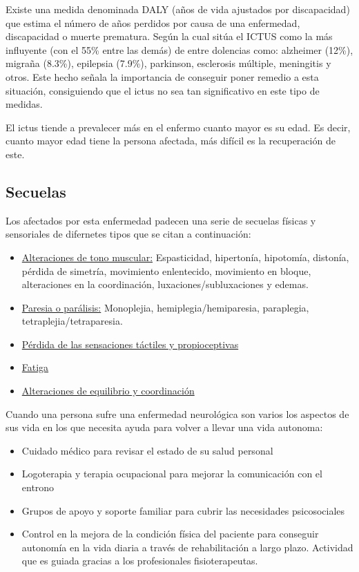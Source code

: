 Existe una medida denominada DALY (años de vida ajustados por discapacidad) que estima el número de años perdidos por causa de una enfermedad, discapacidad o muerte prematura. Según la cual sitúa el ICTUS como la más influyente (con el 55\% entre las demás) de entre dolencias como: alzheimer (12\%), migraña (8.3\%), epilepsia (7.9\%), parkinson, esclerosis múltiple, meningitis y otros. Este hecho señala la importancia de conseguir poner remedio a esta situación, consiguiendo que el ictus no sea tan significativo en este tipo de medidas.

El ictus tiende a prevalecer más en el enfermo cuanto mayor es su edad. Es decir, cuanto mayor edad tiene la persona afectada, más difícil es la recuperación de este. \cite{pentienII}

\subsection{Secuelas}
\label{sec:secuelas}

Los afectados por esta enfermedad padecen una serie de secuelas físicas y sensoriales de difernetes tipos que se citan a continuación:

\begin{itemize}[label=$ \rhd $]
	\item \underline{Alteraciones de tono muscular:} Espasticidad, hipertonía, hipotomía, distonía, pérdida de simetría, movimiento enlentecido, movimiento en bloque, alteraciones en la coordinación, luxaciones/subluxaciones y edemas.
 
	\item \underline{Paresia o parálisis:} Monoplejia, hemiplegia/hemiparesia, paraplegia, tetraplejia/tetraparesia.
	\item \underline{Pérdida de las sensaciones táctiles y propioceptivas}
	\item \underline{Fatiga}
	\item \underline{Alteraciones de equilibrio y coordinación}
\end{itemize}

Cuando una persona sufre una enfermedad neurológica son varios los aspectos de sus vida en los que necesita ayuda para volver a llevar una vida autonoma:
	\begin{itemize}
 		\item Cuidado médico para revisar el estado de su salud personal
 		\item Logoterapia y terapia ocupacional para mejorar la comunicación con el entrono 
 		\item Grupos de apoyo y soporte familiar para cubrir las necesidades psicosociales
		\item Control en la mejora de la condición física del paciente para conseguir autonomía en la vida diaria a través de rehabilitación a largo plazo. Actividad que es guiada gracias a los profesionales fisioterapeutas.
		
	
	\end{itemize}


